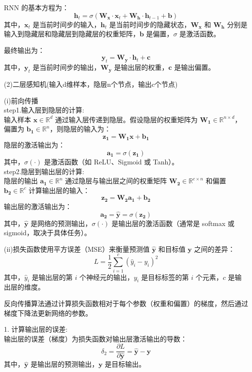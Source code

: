 \documentclass{article}
\begin{document}
RNN 的基本方程为：
\[
\mathbf{h}_t = \sigma(\mathbf{W_x} \cdot \mathbf{x}_t + \mathbf{W_h} \cdot \mathbf{h}_{t-1} + \mathbf{b})
\]
其中，$\mathbf{x}_t$ 是当前时间步的输入，$\mathbf{h}_t$ 是当前时间步的隐藏状态，$\mathbf{W_x}$ 和 $\mathbf{W_h}$ 分别是输入到隐藏层和隐藏层到隐藏层的权重矩阵，$\mathbf{b}$ 是偏置，$\sigma$ 是激活函数。

最终输出为：
\[
\mathbf{y}_t = \mathbf{W_y} \cdot \mathbf{h}_t + \mathbf{c}
\]
其中，$\mathbf{y}_t$ 是当前时间步的输出，$\mathbf{W_y}$ 是输出层的权重，$\mathbf{c}$ 是输出偏置。

(2)二层感知机(输入d维样本，隐层n个节点，输出c个节点)

(i)前向传播\\
step1.输入层到隐层的计算:\\
    输入样本 $\mathbf{x} \in \mathbb{R}^d$ 通过输入层传递到隐层。假设隐层的权重矩阵为 $\mathbf{W_1} \in \mathbb{R}^{n \times d}$，偏置为 $\mathbf{b_1} \in \mathbb{R}^n$，则隐层的输入为：
    \[
    \mathbf{z_1} = \mathbf{W_1} \mathbf{x} + \mathbf{b_1}
    \]
    隐层的激活输出为：
    \[
    \mathbf{a_1} = \sigma(\mathbf{z_1})
    \]
    其中，$\sigma(\cdot)$ 是激活函数（如 ReLU、Sigmoid 或 Tanh）。\\
step2.隐层到输出层的计算:\\
    隐层的输出 $\mathbf{a_1} \in \mathbb{R}^n$ 通过隐层与输出层之间的权重矩阵 $\mathbf{W_2} \in \mathbb{R}^{c \times n}$ 和偏置 $\mathbf{b_2} \in \mathbb{R}^c$ 计算输出层的输入：
    \[
    \mathbf{z_2} = \mathbf{W_2} \mathbf{a_1} + \mathbf{b_2}
    \]
    输出层的激活输出为：
    \[
    \mathbf{a_2} = \hat{\mathbf{y}} = \sigma(\mathbf{z_2})
    \]
    其中，$\hat{\mathbf{y}}$ 是网络的预测输出，$\sigma(\cdot)$ 是输出层的激活函数（通常是 softmax 或 sigmoid，取决于具体任务）。

(ii)损失函数使用平方误差（MSE）来衡量预测值 $\hat{\mathbf{y}}$ 和目标值 $\mathbf{y}$ 之间的差异：
\[
L = \frac{1}{2} \sum_{i=1}^{c} (\hat{y}_i - y_i)^2
\]
其中，$\hat{y}_i$ 是输出层的第 $i$ 个神经元的输出，$y_i$ 是目标标签的第 $i$ 个元素，$c$ 是输出层的维度。

反向传播算法通过计算损失函数相对于每个参数（权重和偏置）的梯度，然后通过梯度下降法更新网络的参数。

1. 计算输出层的误差:\\
    输出层的误差（梯度）为损失函数对输出层激活输出的导数：
    \[
    \delta_2 = \frac{\partial L}{\partial \hat{\mathbf{y}}} = \hat{\mathbf{y}} - \mathbf{y}
    \]
    其中，$\hat{\mathbf{y}}$ 是输出层的预测输出，$\mathbf{y}$ 是目标输出。
\end{document}
